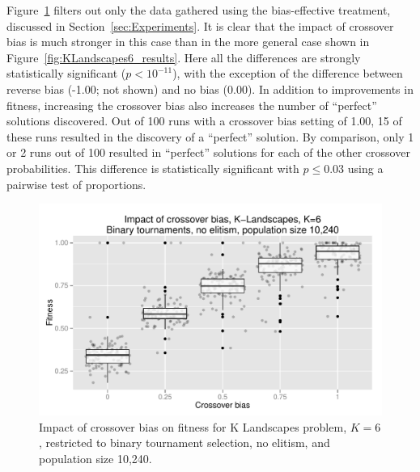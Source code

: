 \documentclass{sig-alternate}
\begin{document}
Figure~\ref{fig:KLandscapes6_strong_results} filters out only the data gathered using the bias-effective treatment,
discussed in Section~\ref{sec:Experiments}. It is clear that the impact of crossover bias is much stronger in this case
than in the more general case shown in Figure~\ref{fig:KLandscapes6_results}. Here all the differences are strongly
statistically significant ($p < 10^{-11}$), with the exception of the difference between reverse bias (-1.00; not shown)
and no bias (0.00). In addition to improvements in fitness, increasing the crossover bias also increases the number of
``perfect'' solutions discovered. Out of 100 runs with a crossover bias setting of 1.00, 15 of these runs resulted in
the discovery of a ``perfect'' solution. By comparison, only 1 or 2 runs out of 100 resulted in ``perfect'' solutions
for each of the other crossover probabilities. This difference is statistically significant with $p \leq 0.03$ using a
pairwise test of proportions.

\begin{figure}
\centering
\includegraphics[width=0.45 \textwidth]{Plots/KLandscapes6_XO_bias_strong_impact_alpha_075.pdf}
\caption{Impact of crossover bias on fitness for K Landscapes problem, $K=6$, restricted to binary tournament
selection, no elitism, and population size 10,240.}
\label{fig:KLandscapes6_strong_results}
\end{figure}

%
%
%
%

%
%
%
%
\end{document}
